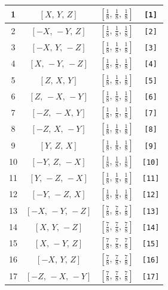 \documentclass[fleqn,8pt]{jsarticle}
\begin{document}
\begin{longtable}{cccc}
1 & $\left[ X,\, Y,\, Z \right]$ & $\left[ \frac{1}{8},\, \frac{1}{8},\, \frac{1}{8} \right]$ & {\tt [1]} \\ \hline
2 & $\left[ - X,\, - Y,\, Z \right]$ & $\left[ \frac{1}{8},\, \frac{1}{8},\, \frac{1}{8} \right]$ & {\tt [2]} \\ \hline
3 & $\left[ - X,\, Y,\, - Z \right]$ & $\left[ \frac{1}{8},\, \frac{1}{8},\, \frac{1}{8} \right]$ & {\tt [3]} \\ \hline
4 & $\left[ X,\, - Y,\, - Z \right]$ & $\left[ \frac{1}{8},\, \frac{1}{8},\, \frac{1}{8} \right]$ & {\tt [4]} \\ \hline
5 & $\left[ Z,\, X,\, Y \right]$ & $\left[ \frac{1}{8},\, \frac{1}{8},\, \frac{1}{8} \right]$ & {\tt [5]} \\ \hline
6 & $\left[ Z,\, - X,\, - Y \right]$ & $\left[ \frac{1}{8},\, \frac{1}{8},\, \frac{1}{8} \right]$ & {\tt [6]} \\ \hline
7 & $\left[ - Z,\, - X,\, Y \right]$ & $\left[ \frac{1}{8},\, \frac{1}{8},\, \frac{1}{8} \right]$ & {\tt [7]} \\ \hline
8 & $\left[ - Z,\, X,\, - Y \right]$ & $\left[ \frac{1}{8},\, \frac{1}{8},\, \frac{1}{8} \right]$ & {\tt [8]} \\ \hline
9 & $\left[ Y,\, Z,\, X \right]$ & $\left[ \frac{1}{8},\, \frac{1}{8},\, \frac{1}{8} \right]$ & {\tt [9]} \\ \hline
10 & $\left[ - Y,\, Z,\, - X \right]$ & $\left[ \frac{1}{8},\, \frac{1}{8},\, \frac{1}{8} \right]$ & {\tt [10]} \\ \hline
11 & $\left[ Y,\, - Z,\, - X \right]$ & $\left[ \frac{1}{8},\, \frac{1}{8},\, \frac{1}{8} \right]$ & {\tt [11]} \\ \hline
12 & $\left[ - Y,\, - Z,\, X \right]$ & $\left[ \frac{1}{8},\, \frac{1}{8},\, \frac{1}{8} \right]$ & {\tt [12]} \\ \hline
13 & $\left[ - X,\, - Y,\, - Z \right]$ & $\left[ \frac{7}{8},\, \frac{7}{8},\, \frac{7}{8} \right]$ & {\tt [13]} \\ \hline
14 & $\left[ X,\, Y,\, - Z \right]$ & $\left[ \frac{7}{8},\, \frac{7}{8},\, \frac{7}{8} \right]$ & {\tt [14]} \\ \hline
15 & $\left[ X,\, - Y,\, Z \right]$ & $\left[ \frac{7}{8},\, \frac{7}{8},\, \frac{7}{8} \right]$ & {\tt [15]} \\ \hline
16 & $\left[ - X,\, Y,\, Z \right]$ & $\left[ \frac{7}{8},\, \frac{7}{8},\, \frac{7}{8} \right]$ & {\tt [16]} \\ \hline
17 & $\left[ - Z,\, - X,\, - Y \right]$ & $\left[ \frac{7}{8},\, \frac{7}{8},\, \frac{7}{8} \right]$ & {\tt [17]} \\ \hline

\end{longtable}
\end{document}
